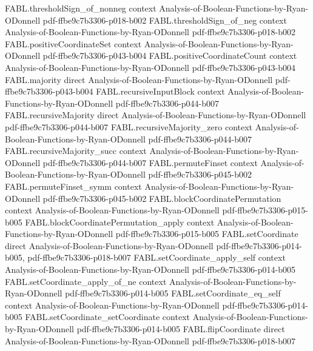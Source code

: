 \begin{theorem}
  {FABL.thresholdSign_of_nonneg}
  {context}
  {Analysis-of-Boolean-Functions-by-Ryan-ODonnell}
  {pdf-ffbe9c7b3306-p018-b002}
\proofstep
  {FABL.thresholdSign_of_neg}
  {context}
  {Analysis-of-Boolean-Functions-by-Ryan-ODonnell}
  {pdf-ffbe9c7b3306-p018-b002}
\proofstep
  {FABL.positiveCoordinateSet}
  {context}
  {Analysis-of-Boolean-Functions-by-Ryan-ODonnell}
  {pdf-ffbe9c7b3306-p043-b004}
\proofstep
  {FABL.positiveCoordinateCount}
  {context}
  {Analysis-of-Boolean-Functions-by-Ryan-ODonnell}
  {pdf-ffbe9c7b3306-p043-b004}
\proofstep
  {FABL.majority}
  {direct}
  {Analysis-of-Boolean-Functions-by-Ryan-ODonnell}
  {pdf-ffbe9c7b3306-p043-b004}
\proofstep
  {FABL.recursiveInputBlock}
  {context}
  {Analysis-of-Boolean-Functions-by-Ryan-ODonnell}
  {pdf-ffbe9c7b3306-p044-b007}
\proofstep
  {FABL.recursiveMajority}
  {direct}
  {Analysis-of-Boolean-Functions-by-Ryan-ODonnell}
  {pdf-ffbe9c7b3306-p044-b007}
\proofstep
  {FABL.recursiveMajority_zero}
  {context}
  {Analysis-of-Boolean-Functions-by-Ryan-ODonnell}
  {pdf-ffbe9c7b3306-p044-b007}
\proofstep
  {FABL.recursiveMajority_succ}
  {context}
  {Analysis-of-Boolean-Functions-by-Ryan-ODonnell}
  {pdf-ffbe9c7b3306-p044-b007}
\proofstep
  {FABL.permuteFinset}
  {context}
  {Analysis-of-Boolean-Functions-by-Ryan-ODonnell}
  {pdf-ffbe9c7b3306-p045-b002}
\proofstep
  {FABL.permuteFinset_symm}
  {context}
  {Analysis-of-Boolean-Functions-by-Ryan-ODonnell}
  {pdf-ffbe9c7b3306-p045-b002}
\proofstep
  {FABL.blockCoordinatePermutation}
  {context}
  {Analysis-of-Boolean-Functions-by-Ryan-ODonnell}
  {pdf-ffbe9c7b3306-p015-b005}
\proofstep
  {FABL.blockCoordinatePermutation_apply}
  {context}
  {Analysis-of-Boolean-Functions-by-Ryan-ODonnell}
  {pdf-ffbe9c7b3306-p015-b005}
\proofstep
  {FABL.setCoordinate}
  {direct}
  {Analysis-of-Boolean-Functions-by-Ryan-ODonnell}
  {pdf-ffbe9c7b3306-p014-b005,
    pdf-ffbe9c7b3306-p018-b007}
\proofstep
  {FABL.setCoordinate_apply_self}
  {context}
  {Analysis-of-Boolean-Functions-by-Ryan-ODonnell}
  {pdf-ffbe9c7b3306-p014-b005}
\proofstep
  {FABL.setCoordinate_apply_of_ne}
  {context}
  {Analysis-of-Boolean-Functions-by-Ryan-ODonnell}
  {pdf-ffbe9c7b3306-p014-b005}
\proofstep
  {FABL.setCoordinate_eq_self}
  {context}
  {Analysis-of-Boolean-Functions-by-Ryan-ODonnell}
  {pdf-ffbe9c7b3306-p014-b005}
\proofstep
  {FABL.setCoordinate_setCoordinate}
  {context}
  {Analysis-of-Boolean-Functions-by-Ryan-ODonnell}
  {pdf-ffbe9c7b3306-p014-b005}
\proofstep
  {FABL.flipCoordinate}
  {direct}
  {Analysis-of-Boolean-Functions-by-Ryan-ODonnell}
  {pdf-ffbe9c7b3306-p018-b007}
\proofstep

\end{theorem}
